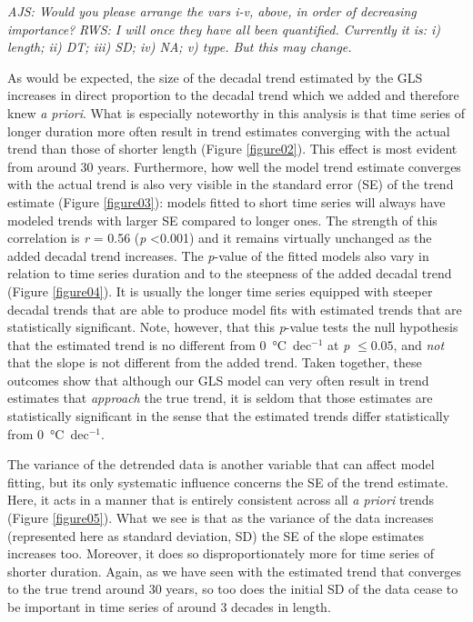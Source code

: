\documentclass[]{ametsoc}
\begin{document}
\emph{AJS: Would you please arrange the vars i-v, above, in order of decreasing importance?}
\emph{RWS: I will once they have all been quantified. Currently it is: i) length; ii) DT; iii) SD; iv) NA; v) type. But this may change.}

As would be expected, the size of the decadal trend estimated by the GLS increases in direct proportion to the decadal trend which we added and therefore knew \emph{a priori}. What is especially noteworthy in this analysis is that time series of longer duration more often result in trend estimates converging with the actual trend than those of shorter length (Figure \ref{figure02}). This effect is most evident from around 30 years. Furthermore, how well the model trend estimate converges with the actual trend is also very visible in the standard error (SE) of the trend estimate (Figure \ref{figure03}): models fitted to short time series will always have modeled trends with larger SE compared to longer ones. The strength of this correlation is \emph{r} = 0.56 (\emph{p} \textless 0.001) and it remains virtually unchanged as the added decadal trend increases. The \emph{p}-value of the fitted models also vary in relation to time series duration and to the steepness of the added decadal trend (Figure \ref{figure04}). It is usually the longer time series equipped with steeper decadal trends that are able to produce model fits with estimated trends that are statistically significant. Note, however, that this \emph{p}-value tests the null hypothesis that the estimated trend is no different from \SI{0}{\degreeCelsius}~dec$^{-1}$ at \emph{p} $\leq 0.05$, and \emph{not} that the slope is not different from the added trend. Taken together, these outcomes show that although our GLS model can very often result in trend estimates that \emph{approach} the true trend, it is seldom that those estimates are statistically significant in the sense that the estimated trends differ statistically from \SI{0}{\degreeCelsius}~dec$^{-1}$.

The variance of the detrended data is another variable that can affect model fitting, but its only systematic influence concerns the SE of the trend estimate. Here, it acts in a manner that is entirely consistent across all \emph{a priori} trends (Figure \ref{figure05}). What we see is that as the variance of the data increases (represented here as standard deviation, SD) the SE of the slope estimates increases too. Moreover, it does so disproportionately more for time series of shorter duration. Again, as we have seen with the estimated trend that converges to the true trend around 30 years, so too does the initial SD of the data cease to be important in time series of around 3 decades in length.
\end{document}
